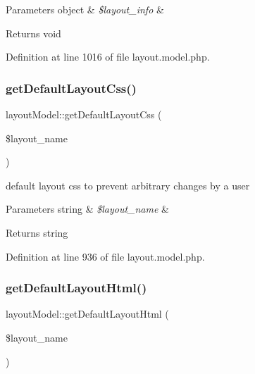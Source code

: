 \begin{DoxyParams}[1]{Parameters}
object & {\em \$layout\+\_\+info} & \\
\hline
\end{DoxyParams}
\begin{DoxyReturn}{Returns}
void 
\end{DoxyReturn}


Definition at line 1016 of file layout.\+model.\+php.

\mbox{\label{classlayoutModel_a986cf32677527f2efeacb8e5c2bc68e6}} 
\subsubsection{\texorpdfstring{get\+Default\+Layout\+Css()}{getDefaultLayoutCss()}}
{\footnotesize\ttfamily layout\+Model\+::get\+Default\+Layout\+Css (\begin{DoxyParamCaption}\item[{}]{\$layout\+\_\+name }\end{DoxyParamCaption})}

default layout css to prevent arbitrary changes by a user 
\begin{DoxyParams}[1]{Parameters}
string & {\em \$layout\+\_\+name} & \\
\hline
\end{DoxyParams}
\begin{DoxyReturn}{Returns}
string 
\end{DoxyReturn}


Definition at line 936 of file layout.\+model.\+php.

\mbox{\label{classlayoutModel_a1ec8ba060697878271fc70fbc0ce2867}} 
\subsubsection{\texorpdfstring{get\+Default\+Layout\+Html()}{getDefaultLayoutHtml()}}
{\footnotesize\ttfamily layout\+Model\+::get\+Default\+Layout\+Html (\begin{DoxyParamCaption}\item[{}]{\$layout\+\_\+name }\end{DoxyParamCaption})}


